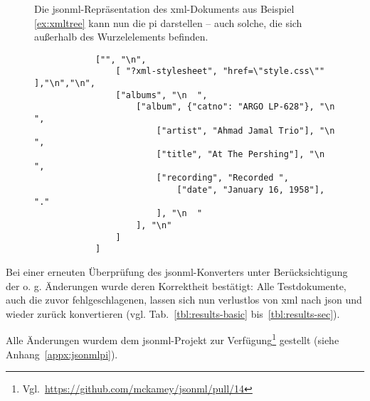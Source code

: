\begin{figure}[h!]

    \begin{example}
        Die \acrshort{jsonml}-Repräsentation des \acrshort{xml}-Dokuments aus Beispiel \ref{ex:xmltree} kann nun die \gls{pi} darstellen -- auch solche, die sich außerhalb des Wurzelelements befinden.
        \begin{verbatim}
            ["", "\n",
                [ "?xml-stylesheet", "href=\"style.css\"" ],"\n","\n",
                ["albums", "\n  ",
                    ["album", {"catno": "ARGO LP-628"}, "\n    ",
                        ["artist", "Ahmad Jamal Trio"], "\n    ",
                        ["title", "At The Pershing"], "\n    ",
                        ["recording", "Recorded ",
                            ["date", "January 16, 1958"], "."
                        ], "\n  "
                    ], "\n"
                ]
            ]
        \end{verbatim}
    \end{example}
\end{figure}

Bei einer erneuten Überprüfung des \acrshort{jsonml}-Konverters unter Berücksichtigung der o. g. Änderungen wurde deren Korrektheit bestätigt: Alle Testdokumente, auch die zuvor fehlgeschlagenen, lassen sich nun verlustlos von \acrshort{xml} nach \acrshort{json} und wieder zurück konvertieren (vgl. Tab.~\ref{tbl:results-basic} bis~\ref{tbl:results-sec}).

Alle Änderungen wurdem dem \acrshort{jsonml}-Projekt zur Verfügung\footnote{Vgl.~\url{https://github.com/mckamey/jsonml/pull/14}} gestellt (siehe Anhang~\ref{appx:jsonmlpi}).
